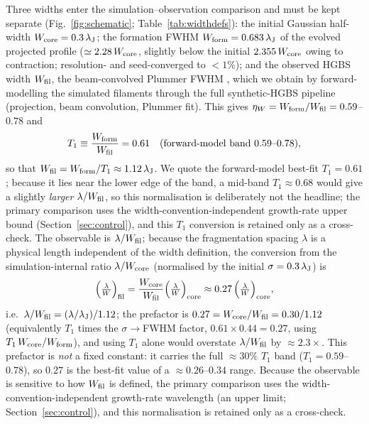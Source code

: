 \documentclass[usenatbib,twoside,twocolumn]{mnras}
\begin{document}
Three widths enter the simulation--observation comparison and must be kept separate (Fig.~\ref{fig:schematic}; Table~\ref{tab:widthdefs}): the initial Gaussian half-width $W_{\rm core}=0.3\,\lambda_{\rm J}$; the formation FWHM $W_{\rm form}=0.683\,\lambda_{\rm J}$ of the evolved projected profile ($\simeq2.28\,W_{\rm core}$, slightly below the initial $2.355\,W_{\rm core}$ owing to contraction; resolution- and seed-converged to $<1\%$); and the observed HGBS width $W_{\rm fil}$, the beam-convolved Plummer FWHM \citep{Arzoumanian2019}, which we obtain by forward-modelling the simulated filaments through the full synthetic-HGBS pipeline (projection, beam convolution, Plummer fit). This gives $\eta_W=W_{\rm form}/W_{\rm fil}=0.59$--$0.78$ and
\begin{equation}
T_1 \equiv \frac{W_{\rm form}}{W_{\rm fil}} = 0.61 \quad (\text{forward-model band } 0.59\text{--}0.78),
\label{eq:t1_correction}
\end{equation}
so that $W_{\rm fil}=W_{\rm form}/T_1\approx1.12\,\lambda_{\rm J}$. We quote the forward-model best-fit $T_1=0.61$; because it lies near the lower edge of the band, a mid-band $T_1\approx0.68$ would give a slightly \emph{larger} $\lambda/W_{\rm fil}$, so this normalisation is deliberately not the headline; the primary comparison uses the width-convention-independent growth-rate upper bound (Section~\ref{sec:control}), and this $T_1$ conversion is retained only as a cross-check. The observable is $\lambda/W_{\rm fil}$; because the fragmentation spacing $\lambda$ is a physical length independent of the width definition, the conversion from the simulation-internal ratio $\lambda/W_{\rm core}$ (normalised by the initial $\sigma=0.3\,\lambda_{\rm J}$) is
\begin{equation}
\Big(\tfrac{\lambda}{W}\Big)_{\rm fil} = \frac{W_{\rm core}}{W_{\rm fil}}\Big(\tfrac{\lambda}{W}\Big)_{\rm core} \approx 0.27\,\Big(\tfrac{\lambda}{W}\Big)_{\rm core},
\label{eq:t1_apply}
\end{equation}
i.e.\ $\lambda/W_{\rm fil}=(\lambda/\lambda_{\rm J})/1.12$; the prefactor is $0.27=W_{\rm core}/W_{\rm fil}=0.30/1.12$ (equivalently $T_1$ times the $\sigma\!\to\!$FWHM factor, $0.61\times0.44=0.27$, using $T_1\,W_{\rm core}/W_{\rm form}$), and using $T_1$ alone would overstate $\lambda/W_{\rm fil}$ by $\approx2.3\times$. This prefactor is \emph{not} a fixed constant: it carries the full $\approx30\%$ $T_1$ band ($T_1=0.59$--$0.78$), so $0.27$ is the best-fit value of a $\approx0.26$--$0.34$ range. Because the observable is sensitive to how $W_{\rm fil}$ is defined, the primary comparison uses the width-convention-independent growth-rate wavelength (an upper limit; Section~\ref{sec:control}), and this normalisation is retained only as a cross-check.
\end{document}
